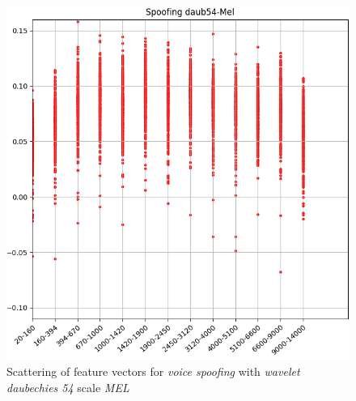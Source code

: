 		\begin{figure}[H]
			\centering
			\includegraphics[scale=.55]{images/results/barkVersusMel/spoofingDaub54Mel}
			\caption{Scattering of feature vectors for \textit{voice spoofing} with \textit{wavelet daubechies 54} scale \textit{MEL}}
			\label{fig:spoofingdaub54mel}
		\end{figure}
